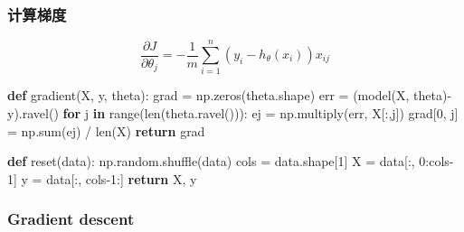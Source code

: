 \documentclass[
]{article}
\newenvironment{Shaded}{}{}
\newcommand{\BuiltInTok}[1]{#1}
\newcommand{\ControlFlowTok}[1]{\textcolor[rgb]{0.00,0.44,0.13}{\textbf{#1}}}
\newcommand{\DecValTok}[1]{\textcolor[rgb]{0.25,0.63,0.44}{#1}}
\newcommand{\KeywordTok}[1]{\textcolor[rgb]{0.00,0.44,0.13}{\textbf{#1}}}
\newcommand{\NormalTok}[1]{#1}
\newcommand{\OperatorTok}[1]{\textcolor[rgb]{0.40,0.40,0.40}{#1}}
\begin{document}
\hypertarget{ux8ba1ux7b97ux68afux5ea6}{%
\subsubsection{计算梯度}\label{ux8ba1ux7b97ux68afux5ea6}}

\[
\frac{\partial J}{\partial \theta_j}=-\frac{1}{m}\sum_{i=1}^n (y_i - h_\theta (x_i))x_{ij}
\]

\begin{Shaded}
\begin{Highlighting}[]
\KeywordTok{def}\NormalTok{ gradient(X, y, theta):}
\NormalTok{    grad }\OperatorTok{=}\NormalTok{ np.zeros(theta.shape)}
\NormalTok{    err }\OperatorTok{=}\NormalTok{ (model(X, theta)}\OperatorTok{{-}}\NormalTok{ y).ravel()}
    \ControlFlowTok{for}\NormalTok{ j }\KeywordTok{in} \BuiltInTok{range}\NormalTok{(}\BuiltInTok{len}\NormalTok{(theta.ravel())):}
\NormalTok{        ej }\OperatorTok{=}\NormalTok{ np.multiply(err, X[:,j])}
\NormalTok{        grad[}\DecValTok{0}\NormalTok{, j] }\OperatorTok{=}\NormalTok{ np.}\BuiltInTok{sum}\NormalTok{(ej) }\OperatorTok{/} \BuiltInTok{len}\NormalTok{(X)}
    \ControlFlowTok{return}\NormalTok{ grad}
\end{Highlighting}
\end{Shaded}

\begin{Shaded}
\begin{Highlighting}[]
\KeywordTok{def}\NormalTok{ reset(data):}
\NormalTok{    np.random.shuffle(data)}
\NormalTok{    cols }\OperatorTok{=}\NormalTok{ data.shape[}\DecValTok{1}\NormalTok{]}
\NormalTok{    X }\OperatorTok{=}\NormalTok{ data[:, }\DecValTok{0}\NormalTok{:cols}\OperatorTok{{-}}\DecValTok{1}\NormalTok{]}
\NormalTok{    y }\OperatorTok{=}\NormalTok{ data[:, cols}\OperatorTok{{-}}\DecValTok{1}\NormalTok{:]}
    \ControlFlowTok{return}\NormalTok{ X, y}
\end{Highlighting}
\end{Shaded}

\hypertarget{gradient-descent}{%
\subsubsection{Gradient descent}\label{gradient-descent}}
\end{document}
